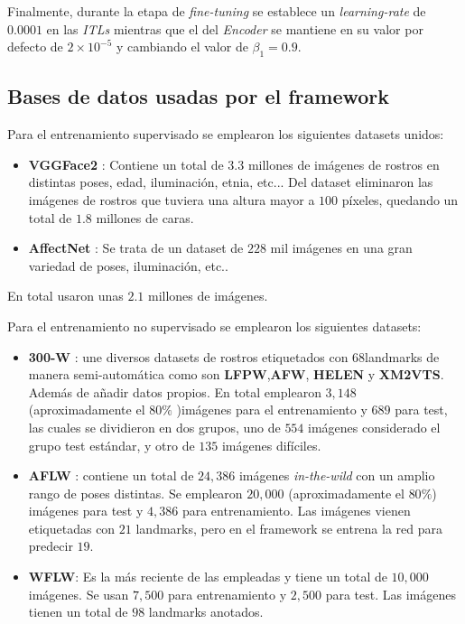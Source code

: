                 \medskip

                \noindent Finalmente, durante la etapa de \textit{fine-tuning} se establece un \textit{learning-rate} de $0.0001$ en las \textit{ITLs} mientras que el del \textit{Encoder} se mantiene en su valor por defecto de $2 \times 10^{-5}$ y cambiando el valor de $\beta_1 = 0.9$.

            \subsection{Bases de datos usadas por el framework}
                
                \noindent Para el entrenamiento supervisado se emplearon los siguientes datasets unidos: 

                \begin{itemize}
                    \item \textbf{VGGFace2} : Contiene un total de $3.3$ millones de imágenes de rostros en distintas poses, edad, iluminación, etnia, etc... Del dataset eliminaron las imágenes de rostros que tuviera una altura mayor a $100$ píxeles, quedando un total de $1.8$ millones de caras.
                    \item \textbf{AffectNet} : Se trata de un dataset de $228$ mil imágenes en una gran variedad de poses, iluminación, etc..
                \end{itemize}

                \noindent En total usaron unas $2.1$ millones de imágenes.

                \noindent Para el entrenamiento no supervisado se emplearon los siguientes datasets: 

                \begin{itemize}
                    \item \textbf{300-W} : une diversos datasets de rostros etiquetados con \textbf{$68$}landmarks de manera semi-automática como son \textbf{LFPW},\textbf{AFW}, \textbf{HELEN} y \textbf{XM2VTS}. Además de añadir datos propios. En total emplearon $3,148$ (aproximadamente el $80 \%$ )imágenes para el entrenamiento y $689$ para test, las cuales se dividieron en dos grupos, uno de $554$ imágenes considerado el grupo test estándar, y otro de $135$ imágenes difíciles.
                    \item \textbf{AFLW} : contiene un total de $24,386$ imágenes \textit{in-the-wild} con un amplio rango de poses distintas. Se emplearon $20,000$ (aproximadamente el $80 \%$) imágenes para test y $4,386$ para entrenamiento. Las imágenes vienen etiquetadas con $21$ landmarks, pero en el framework se entrena la red para predecir \textbf{$19$}.
                    \item \textbf{WFLW}: Es la más reciente de las empleadas y tiene un total de $10,000$ imágenes. Se usan $7,500$ para entrenamiento y $2,500$ para test. Las imágenes tienen un total de \textbf{$98$} landmarks anotados.
                \end{itemize}

